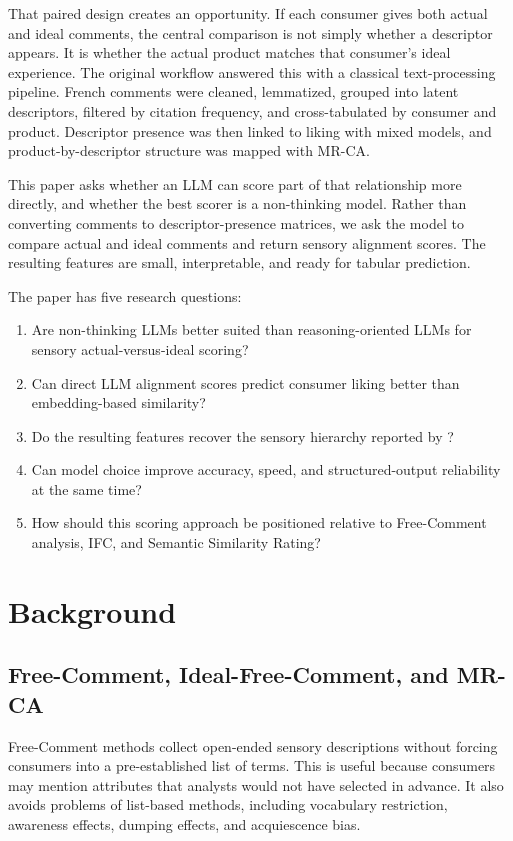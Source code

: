 \documentclass[12pt]{article}
\begin{document}
That paired design creates an opportunity. If each consumer gives both actual and ideal comments, the central comparison is not simply whether a descriptor appears. It is whether the actual product matches that consumer's ideal experience. The original \citet{mahieu2022ifc} workflow answered this with a classical text-processing pipeline. French comments were cleaned, lemmatized, grouped into latent descriptors, filtered by citation frequency, and cross-tabulated by consumer and product. Descriptor presence was then linked to liking with mixed models, and product-by-descriptor structure was mapped with MR-CA.

This paper asks whether an LLM can score part of that relationship more directly, and whether the best scorer is a non-thinking model. Rather than converting comments to descriptor-presence matrices, we ask the model to compare actual and ideal comments and return sensory alignment scores. The resulting features are small, interpretable, and ready for tabular prediction.

The paper has five research questions:
\begin{enumerate}
\item Are non-thinking LLMs better suited than reasoning-oriented LLMs for sensory actual-versus-ideal scoring?
\item Can direct LLM alignment scores predict consumer liking better than embedding-based similarity?
\item Do the resulting features recover the sensory hierarchy reported by \citet{mahieu2022ifc}?
\item Can model choice improve accuracy, speed, and structured-output reliability at the same time?
\item How should this scoring approach be positioned relative to Free-Comment analysis, IFC, and Semantic Similarity Rating?
\end{enumerate}

\section{Background}

\subsection{Free-Comment, Ideal-Free-Comment, and MR-CA}

Free-Comment methods collect open-ended sensory descriptions without forcing consumers into a pre-established list of terms. This is useful because consumers may mention attributes that analysts would not have selected in advance. It also avoids problems of list-based methods, including vocabulary restriction, awareness effects, dumping effects, and acquiescence bias.
\end{document}

